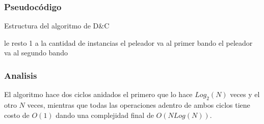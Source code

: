 \subsubsection{Pseudocódigo}
\begin{algorithm}[h!]
\caption{Estructura del algoritmo de D\&C}
\begin{algorithmic}[1]
		\State le resto 1 a la cantidad de instancias 
	\EndIf
            \State el peleador va al primer bando
        \Else
        	\State el peleador va al segundo bando
        \EndIf
        \EndFor
	\EndFor
	\EndFunction
\end{algorithmic}
\end{algorithm}

\subsubsection{Analisis}
El algoritmo hace dos ciclos anidados el primero que lo hace $Log_2(N)$ veces y el otro $N$ veces, mientras que todas las operaciones adentro de ambos ciclos tiene costo de $O(1)$ dando una complejidad final de $O(N Log(N))$.